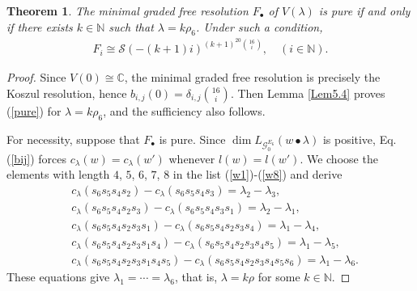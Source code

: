 \documentclass[12pt]{article}
\numberwithin{equation}{section}
\newtheorem{theorem}{Theorem}[section]
\theoremstyle{definition}
\theoremstyle{remark}
\begin{document}
\begin{theorem}\label{Thm5.5}
	The minimal graded free resolution $F_{\bullet}$ of $V(\lambda)$ is pure if and only if there exists $k\in\mathbb{N}$ such that $\lambda=k\rho_6$. Under such a condition,
	\begin{eqnarray}
		F_i\cong\mathscr{S}(-(k+1)i)^{(k+1)^{20}\binom{16}{i}},\quad (i\in\mathbb{N}). \label{pure}
	\end{eqnarray}
\end{theorem}
\begin{proof}
	Since $V(0)\cong\mathbb{C}$, the minimal graded free resolution is precisely the Koszul resolution, hence $b_{i,j}(0)=\delta_{i,j}\binom{16}{i}$. Then Lemma \ref{Lem5.4} proves (\ref{pure}) for $\lambda=k\rho_6$, and the sufficiency also follows.
	
	For necessity, suppose that $F_{\bullet}$ is pure. Since $\dim L_{\mathscr{G}_0^{E_6}}(w\bullet\lambda)$ is positive, Eq. (\ref{bij}) forces $c_{\lambda}(w)=c_{\lambda}(w')$ whenever $l(w)=l(w')$. We choose the elements with length $4$, $5$, $6$, $7$, $8$ in the list (\ref{w1})-(\ref{w8}) and derive
	\begin{eqnarray}
	 &c_{\lambda}(s_6s_5s_4s_2)-c_{\lambda}(s_6s_5s_4s_3)=\lambda_2-\lambda_3,\\
	 &c_{\lambda}(s_6s_5s_4s_2s_3)-c_{\lambda}(s_6s_5s_4s_3s_1)=\lambda_2-\lambda_1,\\
	 &c_{\lambda}(s_6s_5s_4s_2s_3s_1)-c_{\lambda}(s_6s_5s_4s_2s_3s_4)=\lambda_1-\lambda_4,\\
	 &c_{\lambda}(s_6s_5s_4s_2s_3s_1s_4)-c_{\lambda}(s_6s_5s_4s_2s_3s_4s_5)=\lambda_1-\lambda_5,\\
	 &c_{\lambda}(s_6s_5s_4s_2s_3s_1s_4s_5)-c_{\lambda}(s_6s_5s_4s_2s_3s_4s_5s_6)=\lambda_1-\lambda_6.
	\end{eqnarray}
	These equations give $\lambda_1=\cdots=\lambda_6$, that is, $\lambda=k\rho$ for some $k\in\mathbb{N}$.
\end{proof}
\end{document}
